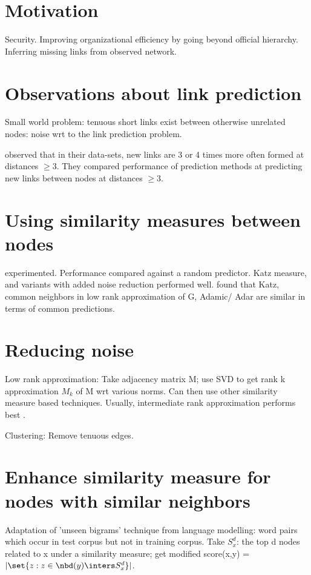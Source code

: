 \documentclass[oneside, article]{memoir}
\begin{document}
\section{Motivation}
Security. Improving organizational efficiency by going beyond official hierarchy. Inferring missing links from observed network.

\section{Observations about link prediction}
Small world problem: tenuous short links exist between otherwise unrelated nodes: noise wrt to the link prediction problem.

\cite{dln:link-prediction} observed that in their data-sets, new links are 3 or 4 times more often formed at distances $\geq 3$. They compared performance of prediction methods at predicting new links between nodes at distances $\geq 3$.

\section{Using similarity measures between nodes}
\cite{dln:link-prediction} experimented. Performance compared against a random predictor. Katz measure, and variants with added noise reduction performed well. \cite{dln:link-prediction} found that Katz, common neighbors in low rank approximation of G, Adamic/ Adar are similar in terms of common predictions. \tbc

\section{Reducing noise}
Low rank approximation: Take adjacency matrix M; use SVD to get rank k approximation $M_{k}$ of M wrt various norms. Can then use other similarity measure based techniques. Usually, intermediate rank approximation performs best \cite{dln:link-prediction} .

Clustering: Remove tenuous edges.

\section{Enhance similarity measure for nodes with similar neighbors}
Adaptation of 'unseen bigrams' technique from language modelling: word pairs which occur in test corpus but not in training corpus. Take $S_{x}^{d}$: the top d nodes related to x under a similarity measure; get modified score(x,y) = $|\set{z: z \in \nbd(y) \inters S_{x}^{d}}|$.
\end{document}
